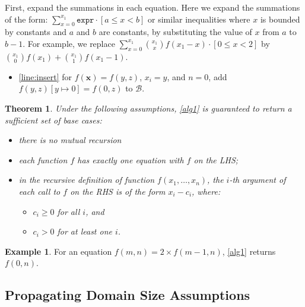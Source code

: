 \documentclass{article}
\newtheorem{theorem}{Theorem}
\theoremstyle{definition}
\newtheorem{example}{Example}
\newcommand{\expr}{\mathtt{expr}}
\begin{document}
First, expand the summations in each equation. Here we expand the summations of
the form: $\sum_{x=0}^{x_{1}} \expr{} \cdot [a \le x < b]$ or similar
inequalities where $x$ is bounded by constants and $a$ and $b$ are constants, by
substituting the value of $x$ from $a$ to $b-1$. For example, we replace
$\sum_{x=0}^{x_1} \binom{x_{1}}{x} f(x_1 - x) \cdot [0 \le x < 2]$ by
$\binom{x_{1}}{0} f(x_1) + \binom{x_{1}}{1} f(x_1-1)$.

\begin{itemize}
  \item \cref{line:insert} for $f(\mathbf{x}) = f(y, z)$, $x_{i} = y$, and
        $n = 0$, add $f(y, z)[y \mapsto 0] = f(0, z)$ to $\mathcal{B}$.
\end{itemize}

\begin{theorem}
  Under the following assumptions, \cref{alg1} is guaranteed to return a
  sufficient set of base cases:
  \begin{itemize}
    \item there is no mutual recursion
    \item each function $f$ has exactly one equation with $f$ on the LHS;
    \item in the recursive definition of function $f(x_{1},\dots,x_{n})$, the
          $i$-th argument of each call to $f$ on the RHS is of the form
          $x_{i} - c_{i}$, where:
          \begin{itemize}
            \item $c_{i} \ge 0$ for all $i$, and
            \item $c_{i} > 0$ for at least one $i$.
          \end{itemize}
  \end{itemize}
\end{theorem}

\begin{example}
  For an equation $f(m, n) = 2 \times f(m-1, n)$, \cref{alg1} returns $f(0, n)$.
\end{example}

\subsection{Propagating Domain Size Assumptions}\label{sec:simplifying}
\end{document}

